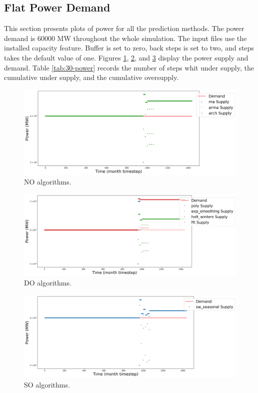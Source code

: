 \documentclass[11pt]{article}
\begin{document}
\subsection{Flat Power Demand}

This section presents plots of power for all the prediction methods. The power demand is 60000 MW throughout the whole simulation. The input files use the installed capacity feature. Buffer is set to zero, back steps is set to two, and steps takes the default value of one.
Figures \ref{fig:30-NO}, \ref{fig:30-DO}, and \ref{fig:30-SO} display the power supply and demand.
Table \ref{tab:30-power} records the number of steps whit under supply, the cumulative under supply, and the cumulative oversupply.

\begin{figure}[!h]
	\centering
	\includegraphics[width=\textwidth]{30-figures/30-power-buffer01.png} 
	\hfill
	\caption{NO algorithms.}
	\label{fig:30-NO}
\end{figure}

\begin{figure}[!h]
	\centering
	\includegraphics[width=\textwidth]{30-figures/30-power-buffer02.png} 
	\hfill
	\caption{DO algorithms.}
	\label{fig:30-DO}
\end{figure}

\begin{figure}[!h]
	\centering
	\includegraphics[width=\textwidth]{30-figures/30-power-buffer03.png} 
	\hfill
	\caption{SO algorithms.}
	\label{fig:30-SO}
\end{figure}
\end{document}
